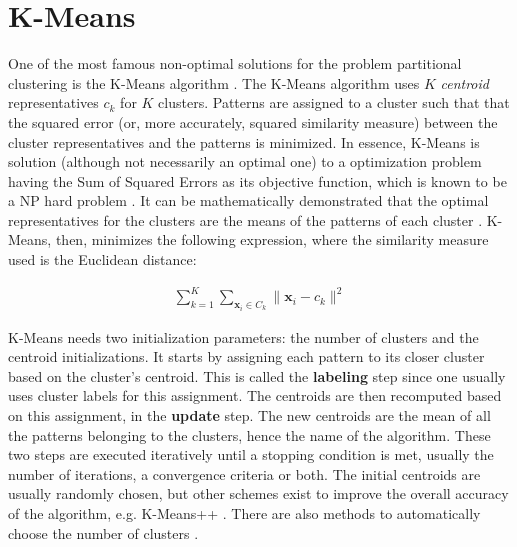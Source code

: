 


\section{K-Means}

One of the most famous non-optimal solutions for the problem partitional clustering is the K-Means algorithm \cite{kmeansoriginal}.
The K-Means algorithm uses $K$ \emph{centroid} representatives $c_k$ for $K$ clusters.
Patterns are assigned to a cluster such that that the squared error (or, more accurately, squared similarity measure) between the cluster representatives and the patterns is minimized.
In essence, K-Means is solution (although not necessarily an optimal one) to a optimization problem having the Sum of Squared Errors as its objective function, which is known to be a NP hard problem \cite{Jain2010}.
It can be mathematically demonstrated that the optimal representatives for the clusters are the means of the patterns of each cluster \cite{Aggarwal2014}.
K-Means, then, minimizes the following expression, where the similarity measure used is the Euclidean distance:

\begin{align}
    \sum^K_{k=1} \sum_{\mathbf{x}_i \in C_k} \| \mathbf{x}_i - c_k  \| ^2  \label{eq:sse}
\end{align}

K-Means needs two initialization parameters: the number of clusters and the centroid initializations.
It starts by assigning each pattern to its closer cluster based on the cluster's centroid.
This is called the \textbf{labeling} step since one usually uses cluster labels for this assignment.
The centroids are then recomputed based on this assignment, in the \textbf{update} step.
The new centroids are the mean of all the patterns belonging to the clusters, hence the name of the algorithm.
These two steps are executed iteratively until a stopping condition is met, usually the number of iterations, a convergence criteria or both.
The initial centroids are usually randomly chosen, but other schemes exist to improve the overall accuracy of the algorithm, e.g. K-Means++ \cite{Arthur2007}.
There are also methods to automatically choose the number of clusters \cite{Aggarwal2014}.

